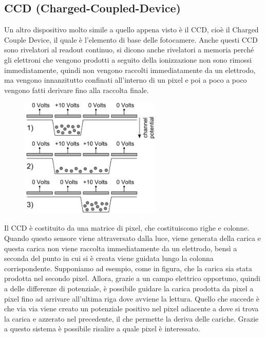 \subsection{CCD (Charged-Coupled-Device)}
Un altro dispositivo molto simile a quello appena visto è il CCD, cioè il Charged Couple Device, il quale è l'elemento di base delle fotocamere. Anche questi CCD sono rivelatori al readout continuo, si dicono anche rivelatori a memoria perché gli elettroni che vengono prodotti a seguito della ionizzazione non sono rimossi immediatamente, quindi non vengono raccolti immediatamente da un elettrodo, ma vengono innanzitutto confinati all'interno di un pixel e poi a poco a poco vengono fatti derivare fino alla raccolta finale.
\begin{figure}[H]
   \centering
   \includegraphics[width=0.6\textwidth]{immagini/CCD.png}
\end{figure}
Il CCD è costituito da una matrice di pixel, che costituiscono righe e colonne. Quando questo sensore viene attraversato dalla luce, viene generata della carica e questa carica non viene raccolta immediatamente da un elettrodo, bensì a seconda del punto in cui si è creata viene guidata lungo la colonna corrispondente. Supponiamo ad esempio, come in figura, che la carica sia stata prodotta nel secondo pixel. Allora, grazie a un campo elettrico opportuno, quindi a delle differenze di potenziale, è possibile guidare la carica prodotta da pixel a pixel fino ad arrivare all'ultima riga dove avviene la lettura. Quello che succede è che via via viene creato un potenziale positivo nel pixel adiacente a dove si trova la carica e azzerato nel precedente, il che permette la deriva delle cariche. Grazie a questo sistema è possibile risalire a quale pixel è interessato.

